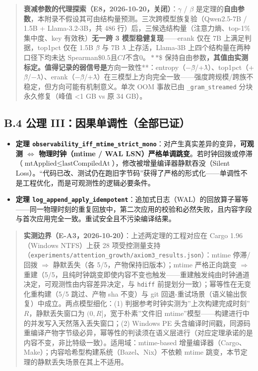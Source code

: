 \begin{quote}
\textbf{衰减参数的代理探索（E8，2026-10-20，关闭）}：\(\gamma\) /
\(\beta\)
是定理的\textbf{自由参数}，本附录不假设其可由结构量预测。三次跨模型族复验（Qwen2.5-7B
/ 1.5B + Llama-3.2-3B，共 486 行）后，三候选结构量（注意力熵、top-1\%
集中度、key 有效秩）\textbf{无一跨 3 模型稳健复现}------erank 仅在 7B
上满足判据，top1pct 仅在 1.5B \(\beta\)̂ 与 7B \(\lambda\)̂
上存活，Llama-3B 上四个结构量在两种口径下均未达
\textbar Spearman\textbar\$\ge\(0.5 且 CI 不含 0。**\)\gamma\$
保持自由参数\textbf{，其值由实测标定。值得记录的弱信号是}方向一致性**：entropy（−\(\beta\)̂/+\(\lambda\)̂）、top1pct（+\(\beta\)̂/−\(\lambda\)̂）、erank（−\(\beta\)̂/+\(\lambda\)̂）在三模型上方向完全一致------强度跨规模/跨族不稳定，但方向可能有机制意义。单次
OOM 事故已由 \texttt{\_gram\_streamed} 分块永久修复（峰值 \textless1 GB
vs 原 34 GB）。
\end{quote}

\subsection{B.4 公理
III：因果单调性（全部已证）}\label{b.4-ux516cux7406-iiiux56e0ux679cux5355ux8c03ux6027ux5168ux90e8ux5df2ux8bc1}

\begin{itemize}
\tightlist
\item
  \textbf{定理
  \texttt{observability\_iff\_mtime\_strict\_mono}}：对产生真实差异的变异，\textbf{可观测
  \(\Leftrightarrow\) 物理时钟（mtime / WAL
  LSN）严格单调跳变}。若时钟回拨或停滞（\(\text{mtApplied} \le \text{lastCompiledAt}\)），修改被增量编译器静默吞没（Silent
  Loss）。``代码已改、测试仍在跑旧字节码''获得了严格的形式化------单调性不是工程优化，而是可观测性的逻辑必要条件。
\item
  \textbf{定理
  \texttt{log\_append\_apply\_idempotent}}：追加式日志（WAL）的回放算子幂等------同一物理时刻的重复回放中，第二次应用的校验和必然失败，且内容字段与首次应用完全一致。重试安全且不污染编译结果。
\end{itemize}

\begin{quote}
\textbf{实测边界（E-A3，2026-10-20）}：上述两定理的工程对应在 Cargo
1.96（Windows NTFS）上获 28
项受控测量支持（\texttt{experiments/attention\_growth/axiom3\_results.json}）：mtime
停滞/回拨 \(\Rightarrow\) 静默丢失（各 5/5，产物保持旧版本）；mtime
严格正向跳变 \(\Rightarrow\)
重建（5/5，且纯时钟跳变即使内容不变也触发------重建触发纯由时钟通道决定，可观测性由内容差异决定，与
\texttt{hdiff} 前提划分一致）；幂等性在无变化重构建（5/5 跳过、产物 sha
不变）与 git 回退-重试场景（语义输出恢复）中成立。两点模型细化：(1)
判据参考时钟实测为''上次构建完成时刻'' \(R\)，静默丢失窗口为
\((0, R]\)，宽于朴素''文件旧
mtime''模型------构建进行中的并发写入天然落入丢失窗口；(2) Windows PE
头含编译时间戳，同源码重编译产物字节级必异，幂等性的判读须在语义层进行（对应定理承诺的是内容不变，非比特级一致）。适用域：mtime-based
增量编译器（Cargo、Make）；内容哈希型构建系统（Bazel、Nix）不依赖 mtime
跳变，本节定理的静默丢失场景在其上不适用。
\end{quote}

